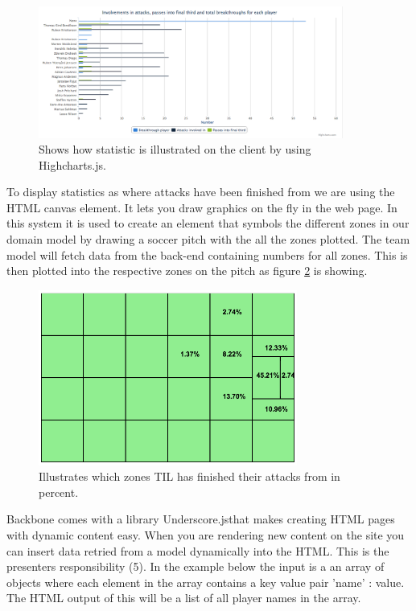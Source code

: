 
\begin{figure}[ht!]
\centering
\includegraphics[width=100mm]{images/general/chart_passes.png}
\caption{Shows how statistic is illustrated on the client by using Highcharts.js.}
\label{fig:chart}
\end{figure}

To display statistics as where attacks have been finished from we are using the \ac{HTML} canvas element. It lets you draw graphics on the fly in the web page. In this system it is used to create an element that symbols the different zones in our domain model by drawing a soccer pitch with the all the zones plotted. The team model will fetch data from the back-end containing numbers for all zones. This is then plotted into the respective zones on the pitch as figure \ref{fig:attacking_zones} is showing.

\begin{figure}[ht!]
\centering
\includegraphics[width=85mm]{images/general/finishing_zones.png}
\caption{ Illustrates which zones \ac{TIL} has finished their attacks from in percent. }
\label{fig:attacking_zones}
\end{figure}

Backbone comes with a library Underscore.js\footnotemark that makes creating HTML pages with dynamic content easy. When you are rendering new content on the site you can insert data retried from a model dynamically into the HTML. This is the presenters responsibility (5). In the example below the input is a an array of objects where each element in the array contains a key value pair 'name' : value. The HTML output of this will be a list of all player names in the array. 

